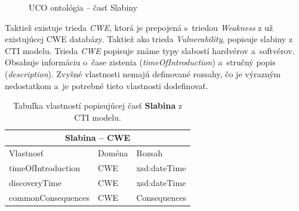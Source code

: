 \documentclass[12pt, a4paper, oneside]{book}
\begin{document}
\begin{figure}[!hb]
\label{fig:ucoSlabiny}
\caption{UCO ontológia -- časť Slabiny}
\end{figure}

Taktiež existuje trieda \textit{CWE}, ktorá je prepojená s~triedou \textit{Weakness} z už existujúcej CWE databázy. Taktiež ako trieda \textit{Vulnerability}, popisuje slabiny z CTI modelu. Trieda \textit{CWE} popisuje známe typy slabostí hardvérov a~softvérov. Obsahuje informáciu o~čase zistenia (\textit{timeOfIntroduction}) a~stručný popis (\textit{description}). Zvyšné vlastnosti nemajú definované rozsahy, čo je výrazným nedostatkom a~je potrebné tieto vlastnosti dodefinovať.
\begin{table}[hbt!]
\centering
\begin{tabular}{ |p{5cm}||p{3cm}|p{3cm}|  }
 \hline
 \multicolumn{3}{|c|}{Slabina -- CWE} \\
 \hline
 Vlastnosť & Doména & Rozsah\\
 \hline
 timeOfIntroduction & CWE & xsd:dateTime\\
 discoveryTime & CWE & xsd:dateTime\\
 commonConsequences & CWE & Consequences\\
 \hline
\end{tabular}
\caption{Tabuľka vlastností popisujúcej časť \textbf{Slabina} z CTI modelu.}
\label{tab:template}
\end{table}
\end{document}
